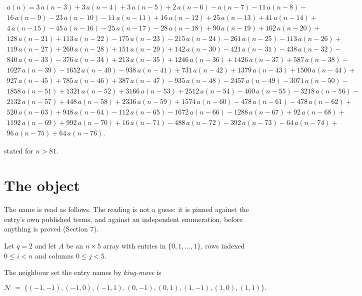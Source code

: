 \documentclass[11pt]{article}
\theoremstyle{definition}
\begin{document}
\begin{multline*} a(n) = 3\,a(n-3) + 3\,a(n-4) + 3\,a(n-5) + 2\,a(n-6) - a(n-7) - 11\,a(n-8) - \\ 16\,a(n-9) - 23\,a(n-10) - 11\,a(n-11) + 16\,a(n-12) + 25\,a(n-13) + 41\,a(n-14) + \\ 4\,a(n-15) - 45\,a(n-16) - 25\,a(n-17) - 28\,a(n-18) + 90\,a(n-19) + 162\,a(n-20) + \\ 128\,a(n-21) + 113\,a(n-22) - 175\,a(n-23) - 215\,a(n-24) - 261\,a(n-25) - 113\,a(n-26) + \\ 119\,a(n-27) + 260\,a(n-28) + 151\,a(n-29) + 142\,a(n-30) - 421\,a(n-31) - 438\,a(n-32) - \\ 840\,a(n-33) - 376\,a(n-34) + 213\,a(n-35) + 1246\,a(n-36) + 1426\,a(n-37) + 587\,a(n-38) - \\ 1027\,a(n-39) - 1652\,a(n-40) - 938\,a(n-41) + 731\,a(n-42) + 1379\,a(n-43) + 1500\,a(n-44) + \\ 927\,a(n-45) + 785\,a(n-46) + 387\,a(n-47) - 935\,a(n-48) - 2457\,a(n-49) - 3071\,a(n-50) - \\ 1858\,a(n-51) + 1321\,a(n-52) + 3166\,a(n-53) + 2512\,a(n-54) - 460\,a(n-55) - 3218\,a(n-56) - \\ 2132\,a(n-57) + 448\,a(n-58) + 2336\,a(n-59) + 1574\,a(n-60) - 478\,a(n-61) - 478\,a(n-62) + \\ 520\,a(n-63) + 948\,a(n-64) - 112\,a(n-65) - 1672\,a(n-66) - 1288\,a(n-67) + 92\,a(n-68) + \\ 1192\,a(n-69) + 992\,a(n-70) + 16\,a(n-71) - 488\,a(n-72) - 392\,a(n-73) - 64\,a(n-74) + \\ 96\,a(n-75) + 64\,a(n-76). \end{multline*}

stated for $n > 81$.

\section{The object}

The name is read as follows. The reading is not a guess: it is pinned against the entry's own published terms, and against an independent enumeration, before anything is proved (Section 7).

Let $q = 2$ and let $A$ be an $n \times 5$ array with entries in $\{0,1,\dots,1\}$, rows indexed $0 \le i < n$ and columns $0 \le j < 5$.

The neighbour set the entry names by {\itshape king-move} is

\[\mathcal{N} \;=\; \{(-1,-1), (-1,0), (-1,1), (0,-1), (0,1), (1,-1), (1,0), (1,1)\}.\]
\end{document}
